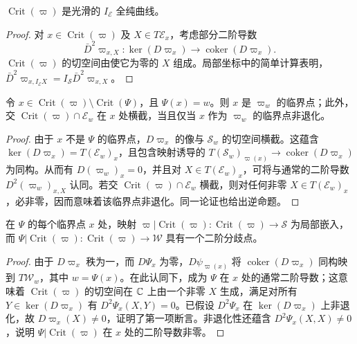 \begin{lemma}\label{st:15.6}
$\operatorname{Crit}(\varpi)$ 是光滑的 $I_{\mathcal E}$ 全纯曲线。
\end{lemma}
\begin{proof}
对 $x\in\operatorname{Crit}(\varpi)$ 及 $X\in T\mathcal E_x$，考虑部分二阶导数
\begin{equation}\label{eq:15.13}
\bar D^2\varpi_{x,X}:\ker(D\varpi_x)\longrightarrow\operatorname{coker}(D\varpi_x).
\end{equation}
$\operatorname{Crit}(\varpi)$ 的切空间由使它为零的 $X$ 组成。局部坐标中的简单计算表明，$\bar D^2\varpi_{x,I_{\mathcal E}X}=I_{\mathcal S}\bar D^2\varpi_{x,X}$。
\end{proof}

\begin{lemma}\label{st:15.7}
令 $x\in\operatorname{Crit}(\varpi)\setminus\operatorname{Crit}(\Psi)$，且 $\Psi(x)=w$。则 $x$ 是 $\varpi_w$ 的临界点；此外，交 $\operatorname{Crit}(\varpi)\cap\mathcal E_w$ 在 $x$ 处横截，当且仅当 $x$ 作为 $\varpi_w$ 的临界点非退化。
\end{lemma}
\begin{proof}
由于 $x$ 不是 $\Psi$ 的临界点，$D\varpi_x$ 的像与 $\mathcal S_w$ 的切空间横截。这蕴含 $\ker(D\varpi_x)=T(\mathcal E_w)_x$，且包含映射诱导的 $T(\mathcal S_w)_{\varpi(x)}\to\operatorname{coker}(D\varpi_x)$ 为同构。从而有 $D(\varpi_w)_x=0$，并且对 $X\in T(\mathcal E_w)_x$，可将与通常的二阶导数 $D^2(\varpi_w)_{x,X}$ 认同。若交 $\operatorname{Crit}(\varpi)\cap\mathcal E_w$ 横截，则对任何非零 $X\in T(\mathcal E_w)_x$，必非零，因而意味着该临界点非退化。同一论证也给出逆命题。
\end{proof}

\begin{lemma}\label{st:15.8}
在 $\Psi$ 的每个临界点 $x$ 处，映射 $\varpi|\operatorname{Crit}(\varpi):\operatorname{Crit}(\varpi)\to\mathcal S$ 为局部嵌入，而 $\Psi|\operatorname{Crit}(\varpi):\operatorname{Crit}(\varpi)\to\mathcal W$ 具有一个二阶分歧点。
\end{lemma}
\begin{proof}
由于 $D\varpi_x$ 秩为一，而 $D\Psi_x$ 为零，$D\psi_{\varpi(x)}$ 将 $\operatorname{coker}(D\varpi_x)$ 同构映到 $T\mathcal W_w$，其中 $w=\Psi(x)$。在此认同下，成为 $\Psi$ 在 $x$ 处的通常二阶导数；这意味着 $\operatorname{Crit}(\varpi)$ 的切空间在 $\mathbb C$ 上由一个非零 $X$ 生成，满足对所有 $Y\in\ker(D\varpi_x)$ 有 $D^2\Psi_x(X,Y)=0$。已假设 $D^2\Psi_x$ 在 $\ker(D\varpi_x)$ 上非退化，故 $D\varpi_x(X)\ne0$，证明了第一项断言。非退化性还蕴含 $D^2\Psi_x(X,X)\ne0$，说明 $\Psi|\operatorname{Crit}(\varpi)$ 在 $x$ 处的二阶导数非零。
\end{proof}

